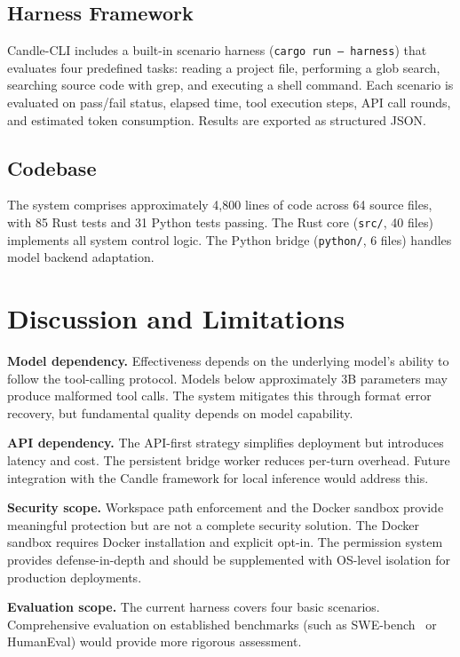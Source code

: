 \documentclass[11pt]{article}
\begin{document}
\subsection{Harness Framework}

Candle-CLI includes a built-in scenario harness (\texttt{cargo run -- harness}) that evaluates four predefined tasks: reading a project file, performing a glob search, searching source code with grep, and executing a shell command. Each scenario is evaluated on pass/fail status, elapsed time, tool execution steps, API call rounds, and estimated token consumption. Results are exported as structured JSON.

\subsection{Codebase}

The system comprises approximately 4,800 lines of code across 64 source files, with 85 Rust tests and 31 Python tests passing. The Rust core (\texttt{src/}, 40 files) implements all system control logic. The Python bridge (\texttt{python/}, 6 files) handles model backend adaptation.

\section{Discussion and Limitations}
\label{sec:discussion}

\textbf{Model dependency.} Effectiveness depends on the underlying model's ability to follow the tool-calling protocol. Models below approximately 3B parameters may produce malformed tool calls. The system mitigates this through format error recovery, but fundamental quality depends on model capability.

\textbf{API dependency.} The API-first strategy simplifies deployment but introduces latency and cost. The persistent bridge worker reduces per-turn overhead. Future integration with the Candle framework for local inference would address this.

\textbf{Security scope.} Workspace path enforcement and the Docker sandbox provide meaningful protection but are not a complete security solution. The Docker sandbox requires Docker installation and explicit opt-in. The permission system provides defense-in-depth and should be supplemented with OS-level isolation for production deployments.

\textbf{Evaluation scope.} The current harness covers four basic scenarios. Comprehensive evaluation on established benchmarks (such as SWE-bench~\cite{sweagent} or HumanEval) would provide more rigorous assessment.
\end{document}
